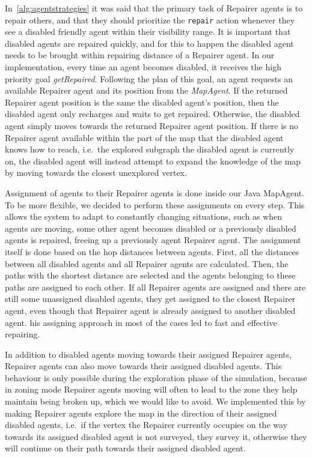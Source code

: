 In~\autoref{alg:agentstrategies} it was said that the primary task of Repairer agents is to repair others, and that they should prioritize the \texttt{repair} action whenever they see a disabled friendly agent within their visibility range.
It is important that disabled agents are repaired quickly, and for this to happen the disabled agent needs to be brought within repairing distance of a Repairer agent.
In our implementation, every time an agent becomes disabled, it receives the high priority goal \emph{getRepaired}.
Following the plan of this goal, an agent requests an available Repairer agent and its position from the \emph{MapAgent}.
If the returned Repairer agent position is the same the disabled agent's position, then the disabled agent only recharges and waits to get repaired.
Otherwise, the disabled agent simply moves towards the returned Repairer agent position.
If there is no Repairer agent available within the part of the map that the disabled agent knows how to reach, i.e.\ the explored subgraph the disabled agent is currently on, the disabled agent will instead attempt to expand the knowledge of the map by moving towards the closest unexplored vertex.

Assignment of agents to their Repairer agents is done inside our Java MapAgent.
To be more flexible, we decided to perform these assignments on every step.
This allows the system to adapt to constantly changing situations, such as when agents are moving, some other agent becomes disabled or a previously disabled agents is repaired, freeing up a previously agent Repairer agent.
The assignment itself is done based on the hop distances between agents.
First, all the distances between all disabled agents and all Repairer agents are calculated.
Then, the paths with the shortest distance are selected and the agents belonging to these paths are assigned to each other.
If all Repairer agents are assigned and there are still some unassigned disabled agents, they get assigned to the closest Repairer agent, even though that Repairer agent is already assigned to another disabled agent.
his assigning approach in most of the cases led to fast and effective repairing.

In addition to disabled agents moving towards their assigned Repairer agents, Repairer agents can also move towards their assigned disabled agents.
This behaviour is only possible during the exploration phase of the simulation, because in zoning mode Repairer agents moving will often to lead to the zone they help maintain being broken up, which we would like to avoid.
We implemented this by making Repairer agents explore the map in the direction of their assigned disabled agents, i.e.\ if the vertex the Repairer currently occupies on the way towards its assigned disabled agent is not surveyed, they survey it, otherwise they will continue on their path towards their assigned disabled agent.

